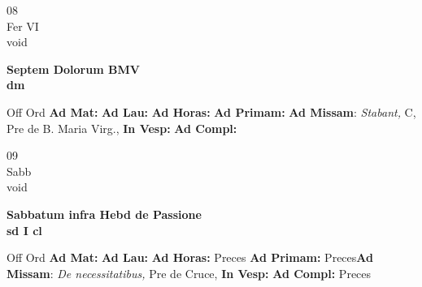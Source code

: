 \documentclass[10pt, openany]{book}
\begin{document}
    \begin{center}
        \begin{minipage}{3.5in}
            \vspace{2em}
            \begin{minipage}{0.5in}
                {\Huge 08} \\
                {\normalsize Fer VI} \\
                {\normalsize void}
            \end{minipage}
            \begin{minipage}{3.0in}
                \textbf{ \large Septem Dolorum BMV \\
                \textnormal{\normalsize dm}} \\ 
            \end{minipage}
            \begin{justify}Off Ord
                \textbf{Ad Mat: }
                \textbf{Ad Lau: }
                \textbf{Ad Horas: }
                \textbf{Ad Primam: }\textbf{Ad Missam}: \textit{Stabant,} C, Pre de B. Maria Virg.,  
                \textbf{In Vesp: }
                \textbf{Ad Compl: }
            \end{justify}
        \end{minipage}
    \end{center}

    \begin{center}
        \begin{minipage}{3.5in}
            \vspace{2em}
            \begin{minipage}{0.5in}
                {\Huge 09} \\
                {\normalsize Sabb} \\
                {\normalsize void}
            \end{minipage}
            \begin{minipage}{3.0in}
                \textbf{ \large Sabbatum infra Hebd de Passione \\
                \textnormal{\normalsize sd I cl}} \\ 
            \end{minipage}
            \begin{justify}Off Ord
                \textbf{Ad Mat: }
                \textbf{Ad Lau: }
                \textbf{Ad Horas: }Preces
                \textbf{Ad Primam: }Preces\textbf{Ad Missam}: \textit{De necessitatibus,} Pre de Cruce,  
                \textbf{In Vesp: }
                \textbf{Ad Compl: }Preces
            \end{justify}
        \end{minipage}
    \end{center}
\end{document}

